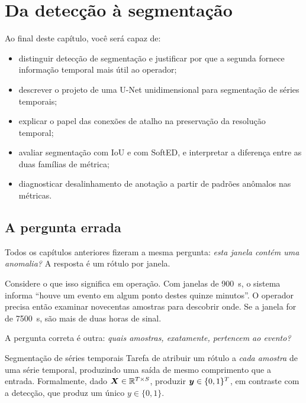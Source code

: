 \chapter{Da detecção à segmentação}
\label{cap:segmentacao}

\begin{objetivos}
Ao final deste capítulo, você será capaz de:
\begin{itemize}[leftmargin=*,itemsep=0.2em]
  \item distinguir detecção de segmentação e justificar por que a segunda fornece
        informação temporal mais útil ao operador;
  \item descrever o projeto de uma U-Net unidimensional para segmentação de séries
        temporais;
  \item explicar o papel das conexões de atalho na preservação da resolução temporal;
  \item avaliar segmentação com IoU e com SoftED, e interpretar a diferença entre
        as duas famílias de métrica;
  \item diagnosticar desalinhamento de anotação a partir de padrões anômalos nas
        métricas.
\end{itemize}
\end{objetivos}

\section{A pergunta errada}

Todos os capítulos anteriores fizeram a mesma pergunta: \emph{esta janela contém uma
anomalia?} A resposta é um rótulo por janela.

Considere o que isso significa em operação. Com janelas de \SI{900}{\second}, o sistema
informa ``houve um evento em algum ponto destes quinze minutos''. O operador precisa
então examinar novecentas amostras para descobrir onde. Se a janela for de
\SI{7500}{\second}, são mais de duas horas de sinal.

A pergunta correta é outra: \emph{quais amostras, exatamente, pertencem ao evento?}

\begin{definicao}{Segmentação de séries temporais}
Tarefa de atribuir um rótulo a \emph{cada amostra} de uma série temporal, produzindo uma
saída de mesmo comprimento que a entrada. Formalmente, dado
$\bm{X} \in \mathbb{R}^{T \times S}$, produzir $\bm{y} \in \{0,1\}^{T}$, em contraste com a
detecção, que produz um único $y \in \{0,1\}$.
\end{definicao}

